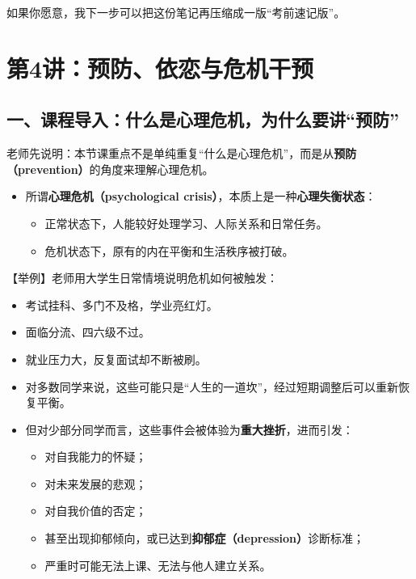 \documentclass[
  chinese,
  9pt,
  a4paper,
]{ctexart}
\providecommand{\tightlist}{%
  \setlength{\itemsep}{0pt}\setlength{\parskip}{0pt}}
\begin{document}
如果你愿意，我下一步可以把这份笔记再压缩成一版``考前速记版''。

\clearpage

\section{第4讲：预防、依恋与危机干预}\label{ux7b2c4ux8bb2ux9884ux9632ux4f9dux604bux4e0eux5371ux673aux5e72ux9884}

\subsection{一、课程导入：什么是心理危机，为什么要讲``预防''}\label{ux4e00ux8bfeux7a0bux5bfcux5165ux4ec0ux4e48ux662fux5fc3ux7406ux5371ux673aux4e3aux4ec0ux4e48ux8981ux8bb2ux9884ux9632}

老师先说明：本节课重点不是单纯重复``什么是心理危机''，而是从\textbf{预防（prevention）}的角度来理解心理危机。

\begin{itemize}
\item
  所谓\textbf{心理危机（psychological
  crisis）}，本质上是一种\textbf{心理失衡状态}：

  \begin{itemize}
  \tightlist
  \item
    正常状态下，人能较好处理学习、人际关系和日常任务。
  \item
    危机状态下，原有的内在平衡和生活秩序被打破。
  \end{itemize}
\end{itemize}

【举例】老师用大学生日常情境说明危机如何被触发：

\begin{itemize}
\item
  考试挂科、多门不及格，学业亮红灯。
\item
  面临分流、四六级不过。
\item
  就业压力大，反复面试却不断被刷。
\item
  对多数同学来说，这些可能只是``人生的一道坎''，经过短期调整后可以重新恢复平衡。
\item
  但对少部分同学而言，这些事件会被体验为\textbf{重大挫折}，进而引发：

  \begin{itemize}
  \tightlist
  \item
    对自我能力的怀疑；
  \item
    对未来发展的悲观；
  \item
    对自我价值的否定；
  \item
    甚至出现抑郁倾向，或已达到\textbf{抑郁症（depression）}诊断标准；
  \item
    严重时可能无法上课、无法与他人建立关系。
  \end{itemize}
\end{itemize}
\end{document}
